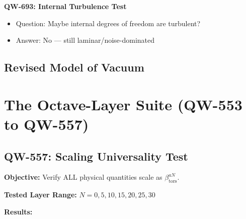 \documentclass[11pt, a4paper]{article}
\theoremstyle{remark}
\newcommand{\betators}{\beta_{\text{tors}}}
\begin{document}
\textbf{QW-693: Internal Turbulence Test}
\begin{itemize}
    \item Question: Maybe internal degrees of freedom are turbulent?
    \item Answer: No --- still laminar/noise-dominated
\end{itemize}

\subsection{Revised Model of Vacuum}

\begin{center}
\end{center}

\section{The Octave-Layer Suite (QW-553 to QW-557)}

\subsection{QW-557: Scaling Universality Test}

\textbf{Objective:} Verify ALL physical quantities scale as $\betators^{aN}$.

\textbf{Tested Layer Range:} $N = 0, 5, 10, 15, 20, 25, 30$

\textbf{Results:}
\end{document}
